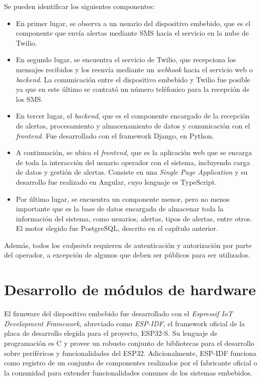 Se pueden identificar los siguientes componentes:
\begin{itemize}
	\item En primer lugar, se observa a un usuario del dispositivo embebido, que es el componente que envía alertas mediante SMS hacia el servicio en la nube de Twilio.
	\item En segundo lugar, se encuentra el servicio de Twilio, que recepciona los mensajes recibidos y los reenvía mediante un \textit{webhook} hacia el servicio web o \textit{backend}. La comunicación entre el dispositivo embebido y Twilio fue posible ya que en este último se contrató un número teléfonico para la recepción de los SMS. 
	\item En tercer lugar, el \textit{backend}, que es el componente encargado de la recepción de alertas, procesamiento y almacenamiento de datos y comunicación con el \textit{frontend}. Fue desarrollado con el framework Django, en Python.
	\item A continuación, se ubica el \textit{frontend}, que es la aplicación web que se encarga de toda la interacción del usuario operador con el sistema, incluyendo carga de datos y gestión de alertas. Consiste en una \textit{Single Page Application } y su desarrollo fue realizado en Angular, cuyo lenguaje es TypeScript\citep{ANGULAR:1}.
	\item Por último lugar, se encuentra un componente menor, pero no menos importante que es la base de datos encargada de almacenar toda la información del sistema, como usuarios, alertas, tipos de alertas, entre otros. El motor elegido fue PostgreSQL, descrito en el capítulo anterior.
\end{itemize}

Además, todos los \textit{endpoints} requieren de autenticación y autorización por parte del operador, a excepción de algunos que deben ser públicos para ser utilizados.
   
\section{Desarrollo de módulos de hardware}

El firmware del dispositivo embebido fue desarrollado con el \textit{Espressif IoT Development Framework}, abreviado como \textit{ESP-IDF}, el framework oficial de la placa de desarrollo elegida para el proyecto, ESP32-S\citep{ESPIDF:1}. Su lenguaje de programación es C y provee un robusto conjunto de bibliotecas para el desarrollo sobre periféricos y funcionalidades del ESP32. Adicionalmente, ESP-IDF funciona como registro de un conjunto de componentes realizados por el fabricante oficial o la comunidad para extender funcionalidades comunes de los sistemas embebidos. 

